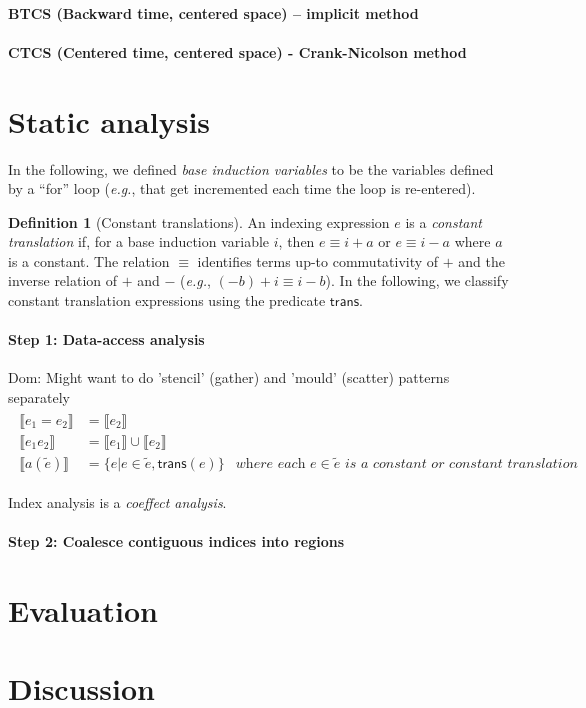 \documentclass[10pt]{sigplanconf}
\newcommand{\dnote}[1]{\textcolor{darkpurple}{Dom: #1}}
\newcounter{block}
\theoremstyle{definition}
\newtheorem{definition}[block]{Definition}
\newcommand{\eg}{\emph{e.g.}}
\newcommand{\interp}[1]{\llbracket{#1}\rrbracket}
\begin{document}
\paragraph{BTCS (Backward time, centered space) -- implicit method}

\paragraph{CTCS (Centered time, centered space) - Crank-Nicolson method}



\section{Static analysis}

In the following, we defined
\emph{base induction variables} to be the variables
 defined by a ``for'' loop (\eg{}, that get incremented each time the
loop is re-entered). 

\begin{definition}[Constant translations]
An indexing expression $e$ is a \emph{constant translation} if,
for a base induction variable $i$, then $e \equiv i + a$ or $e \equiv i - a$ 
where $a$ is a constant. The relation $\equiv$ identifies terms
up-to commutativity of $+$ and the inverse
relation of $+$ and $-$ (\eg{}, $(-b) + i \equiv i - b$). 
In the following, we classify constant translation expressions 
using the predicate $\textsf{trans}$.
\end{definition}

\paragraph{Step 1: Data-access analysis}

\dnote{Might want to do 'stencil' (gather) and 'mould' (scatter)
  patterns separately}
\begin{align*}
\begin{array}{lll}
\interp{e_1 = e_2}    & = \interp{e_2} \\
\interp{e_1 e_2}      & = \interp{e_1} \cup \interp{e_2} \\
\interp{a(\tilde{e})} & = \{e | e \in \tilde{e}, \textsf{trans}(e)\} & \textit{where each $e \in
                                          \tilde{e}$ is a constant or constant translation}
\end{array}
\end{align*}

Index analysis is a \emph{coeffect analysis}.

\paragraph{Step 2: Coalesce contiguous indices into regions}


\section{Evaluation}

\section{Discussion}



\end{document}

